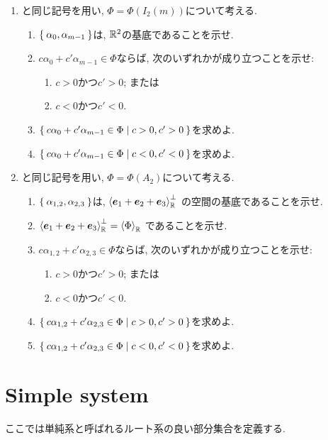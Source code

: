 \begin{enumerate}
\item
  と同じ記号を用い,
  $\Phi=\Phi(I_2(m))$について考える.
  \begin{enumerate}
  \item $\Set{\alpha_0,\alpha_{m-1}}$は, $\mathbb{R}^2$の基底であることを示せ.
  \item $c\alpha_0+c'\alpha_{m-1}\in \Phi$ならば, 次のいずれかが成り立つことを示せ:
    \begin{enumerate}
      \item $c>0$かつ$c'>0$; または
      \item $c<0$かつ$c'<0$.
    \end{enumerate}
  \item $\Set{c\alpha_0+c'\alpha_{m-1}\in \Phi|c>0,c'>0}$を求めよ.
  \item $\Set{c\alpha_0+c'\alpha_{m-1}\in \Phi|c<0,c'<0}$を求めよ.
  \end{enumerate}
\item
  と同じ記号を用い,
  $\Phi=\Phi(A_2)$について考える.
  \begin{enumerate}
  \item
    $\Set{\alpha_{1,2},\alpha_{2,3}}$は,
    $\Braket{\boldsymbol{e}_1+\boldsymbol{e}_2+\boldsymbol{e}_3}_{\mathbb{R}}^{\perp}$
    の空間の基底であることを示せ.
  \item
    $\Braket{\boldsymbol{e}_1+\boldsymbol{e}_2+\boldsymbol{e}_3}_{\mathbb{R}}^{\perp}=\Braket{\Phi}_{\mathbb{R}}$
    であることを示せ.
  \item
    $c\alpha_{1,2}+c'\alpha_{2,3}\in \Phi$ならば, 次のいずれかが成り立つことを示せ:
    \begin{enumerate}
      \item $c>0$かつ$c'>0$; または
      \item $c<0$かつ$c'<0$.
    \end{enumerate}
  \item $\Set{c\alpha_{1,2}+c'\alpha_{2,3}\in \Phi|c>0,c'>0}$を求めよ.
  \item $\Set{c\alpha_{1,2}+c'\alpha_{2,3}\in \Phi|c<0,c'<0}$を求めよ.
  \end{enumerate}
\end{enumerate}


\chapter{Simple system}
ここでは単純系と呼ばれるルート系の良い部分集合を定義する.

